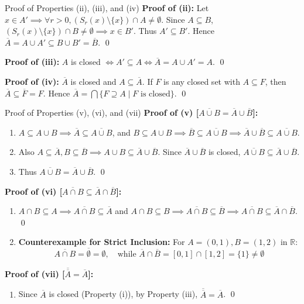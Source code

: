 \documentclass[11pt,a4paper]{article}
\begin{document}
\begin{exbox}{Proof of Properties (ii), (iii), and (iv)}
\textbf{Proof of (ii):} Let $x \in A' \implies \forall r > 0, (S_r(x) \setminus \{x\}) \cap A \neq \emptyset$. Since $A \subseteq B$, $(S_r(x) \setminus \{x\}) \cap B \neq \emptyset \implies x \in B'$. Thus $A' \subseteq B'$. Hence $\overline{A} = A \cup A' \subseteq B \cup B' = \overline{B}$. \qed

\textbf{Proof of (iii):} $A$ is closed $\iff A' \subseteq A \iff \overline{A} = A \cup A' = A$. \qed

\textbf{Proof of (iv):} $\overline{A}$ is closed and $A \subseteq \overline{A}$. If $F$ is any closed set with $A \subseteq F$, then $\overline{A} \subseteq \overline{F} = F$. Hence $\overline{A} = \bigcap \{F \supseteq A \mid F \text{ is closed}\}$. \qed
\end{exbox}

\newpage

\begin{exbox}{Proof of Properties (v), (vi), and (vii)}
\textbf{Proof of (v) [$\overline{A \cup B} = \overline{A} \cup \overline{B}$]:}
\begin{enumerate}
    \item $A \subseteq A \cup B \implies \overline{A} \subseteq \overline{A \cup B}$, and $B \subseteq A \cup B \implies \overline{B} \subseteq \overline{A \cup B} \implies \overline{A} \cup \overline{B} \subseteq \overline{A \cup B}$.
    \item Also $A \subseteq \overline{A}, B \subseteq \overline{B} \implies A \cup B \subseteq \overline{A} \cup \overline{B}$. Since $\overline{A} \cup \overline{B}$ is closed, $\overline{A \cup B} \subseteq \overline{A} \cup \overline{B}$.
    \item Thus $\overline{A \cup B} = \overline{A} \cup \overline{B}$. \qed
\end{enumerate}

\textbf{Proof of (vi) [$\overline{A \cap B} \subseteq \overline{A} \cap \overline{B}$]:}
\begin{enumerate}
    \item $A \cap B \subseteq A \implies \overline{A \cap B} \subseteq \overline{A}$ and $A \cap B \subseteq B \implies \overline{A \cap B} \subseteq \overline{B} \implies \overline{A \cap B} \subseteq \overline{A} \cap \overline{B}$. \qed
    \item \textbf{Counterexample for Strict Inclusion:} For $A = (0, 1), B = (1, 2)$ in $\mathbb{R}$:
    $$\overline{A \cap B} = \overline{\emptyset} = \emptyset, \quad \text{while } \overline{A} \cap \overline{B} = [0, 1] \cap [1, 2] = \{1\} \neq \emptyset$$
\end{enumerate}

\textbf{Proof of (vii) [$\overline{\overline{A}} = \overline{A}$]:}
\begin{enumerate}
    \item Since $\overline{A}$ is closed (Property (i)), by Property (iii), $\overline{\overline{A}} = \overline{A}$. \qed
\end{enumerate}
\end{exbox}
\end{document}
